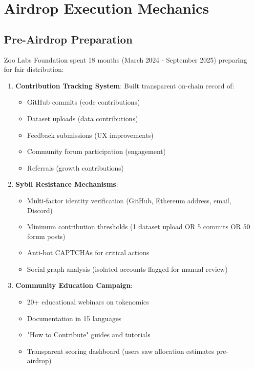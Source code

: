 \section{Airdrop Execution Mechanics}


\subsection{Pre-Airdrop Preparation}

Zoo Labs Foundation spent 18 months (March 2024 - September 2025) preparing for fair distribution:

\begin{enumerate}
\item \textbf{Contribution Tracking System}: Built transparent on-chain record of:
    \begin{itemize}
    \item GitHub commits (code contributions)
    \item Dataset uploads (data contributions)
    \item Feedback submissions (UX improvements)
    \item Community forum participation (engagement)
    \item Referrals (growth contributions)
    \end{itemize}

\item \textbf{Sybil Resistance Mechanisms}:
    \begin{itemize}
    \item Multi-factor identity verification (GitHub, Ethereum address, email, Discord)
    \item Minimum contribution thresholds (1 dataset upload OR 5 commits OR 50 forum posts)
    \item Anti-bot CAPTCHAs for critical actions
    \item Social graph analysis (isolated accounts flagged for manual review)
    \end{itemize}

\item \textbf{Community Education Campaign}:
    \begin{itemize}
    \item 20+ educational webinars on tokenomics
    \item Documentation in 15 languages
    \item "How to Contribute" guides and tutorials
    \item Transparent scoring dashboard (users saw allocation estimates pre-airdrop)
    \end{itemize}


\end{enumerate}
